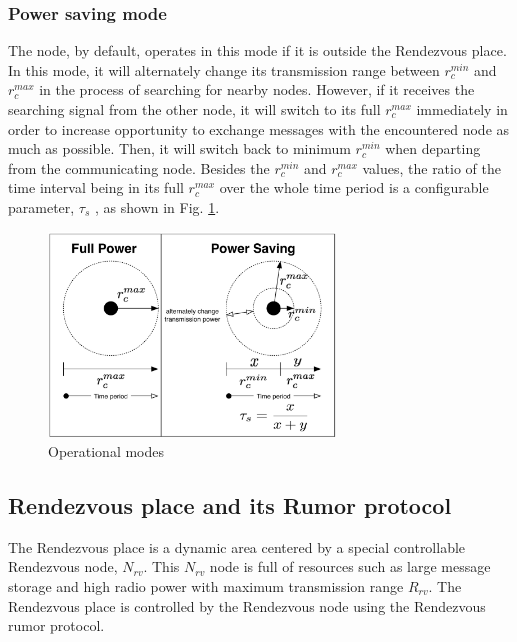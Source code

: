 \subsubsection{Power saving mode}
The node, by default, operates in this mode if it is outside the Rendezvous place.
%
In this mode, it will alternately change its transmission range between ${ r }_{ c }^{ min }$ and ${ r }_{ c }^{ max }$ in the process of searching for nearby nodes.
%
However, if it receives the searching signal from the other node, it will switch to its full ${ r }_{ c }^{ max }$ immediately in order to increase opportunity to exchange messages with the encountered node as much as possible.
%
Then, it will switch back to minimum ${ r }_{ c }^{ min }$ when departing from the communicating node.
%
Besides the ${ r }_{ c }^{ min }$ and ${ r }_{ c }^{ max }$ values, the ratio of the time interval being in its full ${ r }_{ c }^{ max }$ over the whole time period is a configurable parameter, $\tau_{s}$ , as shown in Fig. \ref{Operational modes}.

\begin{figure}[!t]
	\centering
	\includegraphics[width=3in]{Figures/OperationalMode.pdf}
	\caption{Operational modes}
	\label{Operational modes}
\end{figure}


\subsection{Rendezvous place and its Rumor protocol}

The Rendezvous place is a dynamic area centered by a special controllable Rendezvous node, $N_{rv}$.
%
This $N_{rv}$ node is full of resources such as large message storage and high radio power with maximum transmission range $R_{rv}$.
%
The Rendezvous place is controlled by the Rendezvous node using the Rendezvous rumor protocol.

